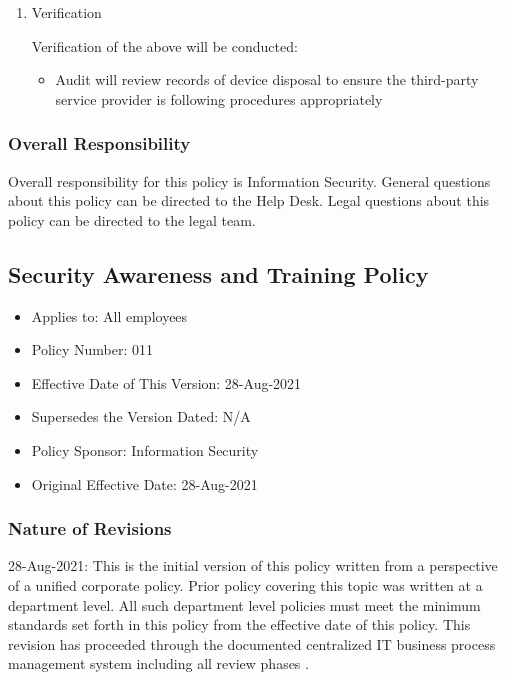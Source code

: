 \documentclass[stu]{apa7}
\begin{document}
\begin{enumerate}
\item Verification
\label{sec:orgeb93129}

Verification of the above will be conducted:

\begin{itemize}
\item Audit will review records of device disposal to ensure the third-party service provider is following procedures appropriately
\end{itemize}
\end{enumerate}

\subsubsection{Overall Responsibility}
\label{sec:orgf3920af}

Overall responsibility for this policy is Information Security. General questions about this policy can be directed to the Help Desk. Legal questions about this policy can be directed to the legal team.

\subsection{Security Awareness and Training Policy}
\label{sec:org473a0a6}

\begin{itemize}
\item Applies to: All employees
\item Policy Number: 011
\item Effective Date of This Version: 28-Aug-2021
\item Supersedes the Version Dated: N/A
\item Policy Sponsor: Information Security
\item Original Effective Date: 28-Aug-2021
\end{itemize}

\subsubsection{Nature of Revisions}
\label{sec:orgfa83bc1}

28-Aug-2021: This is the initial version of this policy written from a perspective of a unified corporate policy. Prior policy covering this topic was written at a department level. All such department level policies must meet the minimum standards set forth in this policy from the effective date of this policy. This revision has proceeded through the documented centralized IT business process management system including all review phases \cite{wagleDevelopmentEffectiveCentralized2021}.
\end{document}
